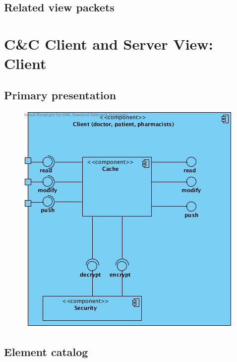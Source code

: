 \documentclass[a4paper,10pt]{book}
\begin{document}
\subsection{Related view packets}



\section{C\&C Client and Server View: Client}
\label{Client and Server View: Client}

\subsection{Primary presentation}

\begin{center}
    \begin{figure}
      \includegraphics[width=\textwidth]{../images/ClientServer_Client.png}
    \end{figure}
  \end{center}

\subsection{Element catalog}
\end{document}
